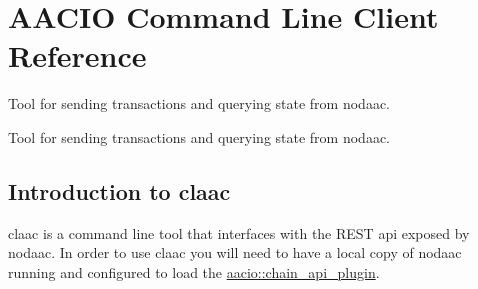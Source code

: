 \hypertarget{group__aacclienttool}{}\section{A\+A\+C\+IO Command Line Client Reference}
\label{group__aacclienttool}


Tool for sending transactions and querying state from nodaac.  


Tool for sending transactions and querying state from nodaac. 

\hypertarget{group__aacclienttool_intro}{}\subsection{Introduction to claac}\label{group__aacclienttool_intro}
{\ttfamily claac} is a command line tool that interfaces with the R\+E\+ST api exposed by nodaac. In order to use {\ttfamily claac} you will need to have a local copy of {\ttfamily nodaac} running and configured to load the \textquotesingle{}\mbox{\hyperlink{classaacio_1_1chain__api__plugin}{aacio\+::chain\+\_\+api\+\_\+plugin}}\textquotesingle{}.

